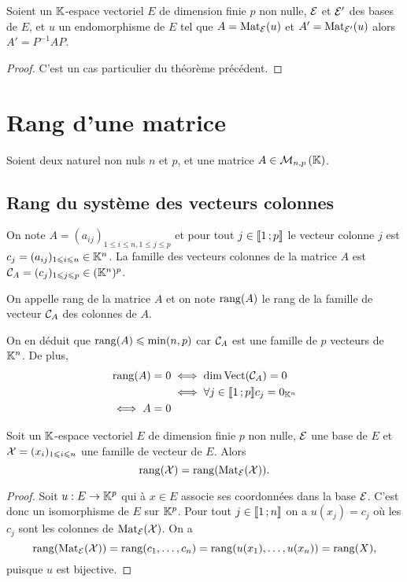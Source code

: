 \begin{theo}
  Soient un \(\mathbb{K}\)-espace vectoriel \(E\) de dimension finie \(p\) non 
  nulle, \(\mathcal{E}\) et \(\mathcal{E}'\) des bases de \(E\), et \(u\) un endomorphisme de 
  \(E\) tel que \(A=\mathrm{Mat}_{\mathcal{E}}(u)\) et \(A'=\mathrm{Mat}_{\mathcal{E}'}(u)\) alors 
  \(A'=P^{-1}AP\).
\end{theo}
\begin{proof}
  C'est un cas particulier du théorème précédent.
\end{proof}

\section{Rang d'une matrice}

Soient deux naturel non nuls \(n\) et \(p\), et une matrice \(A \in 
\mathcal{M}_{n,p}\left(\mathbb{K}\right)\).

\subsection{Rang du système des vecteurs colonnes}

On note \(A=(a_{ij})_{1\leqslant i\leqslant n, 1\leqslant j\leqslant p}\) et 
pour tout \(j \in \mathopen{\llbracket}1\mathclose{}\mathpunct{};p\mathclose{\rrbracket}\) le vecteur colonne \(j\) est 
\(c_j=(a_{ij})_{1 \leqslant i \leqslant n} \in \mathbb{K}^n\). La famille des 
vecteurs colonnes de la matrice \(A\) est \(\mathcal{C}_A=(c_j)_{1 \leqslant j 
\leqslant p} \in (\mathbb{K}^n)^p\).

\begin{defdef}
  On appelle rang de la matrice \(A\) et on note \(\operatorname{rang}(A)\)  le rang de la 
  famille de vecteur \(\mathcal{C}_A\) des colonnes de \(A\).
\end{defdef}

On en déduit que \(\operatorname{rang}(A) \leqslant \min(n,p)\) car \(\mathcal{C}_A\) est une 
famille de \(p\) vecteurs de \(\mathbb{K}^n\). De plus,
\begin{align}
  \operatorname{rang}(A) = 0 &\iff \dim \operatorname{Vect}(\mathcal{C}_A)=0 \\
  &\iff \forall j \in \mathopen{\llbracket}1\mathclose{}\mathpunct{};p\mathclose{\rrbracket} c_j = 0_{\mathbb{K}^n} \\
  \iff A=0
\end{align}

\begin{prop}
  Soit un \(\mathbb{K}\)-espace vectoriel \(E\) de dimension finie \(p\) non nulle, 
  \(\mathcal{E}\) une base de \(E\) et \(\mathcal{X}=(x_i)_{1\leqslant i\leqslant n}\) une 
  famille de vecteur de \(E\). Alors
  \begin{equation}
    \operatorname{rang}(\mathcal{X})=\operatorname{rang}(\mathrm{Mat}_{\mathcal{E}}(\mathcal{X})).
  \end{equation}
\end{prop}
\begin{proof}
  Soit \(u: E \rightarrow \mathbb{K}^p\) qui à \(x \in E\) associe ses coordonnées 
  dans la base \(\mathcal{E}\). C'est donc un isomorphisme de \(E\) sur \(\mathbb{K}^p\). 
  Pour tout \(j \in \mathopen{\llbracket}1\mathclose{}\mathpunct{};n\mathclose{\rrbracket}\) on a \(u(x_j)=c_j\) où les 
  \(c_j\) sont les colonnes de \(\mathrm{Mat}_{\mathcal{E}}(\mathcal{X})\). On a
  \begin{equation}
    \operatorname{rang}(\mathrm{Mat}_{\mathcal{E}}(\mathcal{X})) = \operatorname{rang}(c_1,\ldots,c_n) = 
    \operatorname{rang}(u(x_1),\ldots,u(x_n))=\operatorname{rang}(X),
  \end{equation}
  puisque \(u\) est bijective.
\end{proof}

